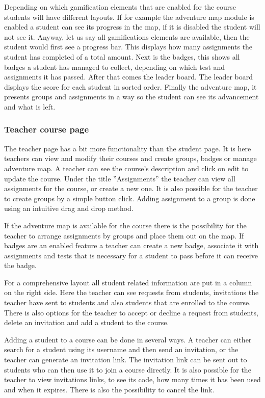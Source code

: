 Depending on which gamification elements that are enabled for the course students will have different layouts. If for example the adventure map module is enabled a student can see its progress in the map, if it is disabled the student will not see it. Anyway, let us say all gamifications elements are available, then the student would first see a progress bar. This displays how many assignments the student has completed of a total amount. Next is the badges, this shows all badges a student has managed to collect, depending on which test and assignments it has passed. After that comes the leader board. The leader board displays the score for each student in sorted order. Finally the adventure map, it presents groups and assignments in a way so the student can see its advancement and what is left. 

\subsubsection{Teacher course page}
The teacher page has a bit more functionality than the student page. It is here teachers can view and modify their courses and create groups, badges or manage adventure map. A teacher can see the course's description and click on edit to update the course. Under the title ''Assignments'' the teacher can view all assignments for the course, or create a new one. It is also possible for the teacher to create groups by a simple button click. Adding assignment to a group is done using an intuitive drag and drop method. 

If the adventure map is available for the course there is the possibility for the teacher to arrange assignments by groups and place them out on the map. If badges are an enabled feature a teacher can create a new badge, associate it with assignments and tests that is necessary for a student to pass before it can receive the badge.

For a comprehensive layout all student related information are put in a column on the right side. Here the teacher can see requests from students, invitations the teacher have sent to students and also students that are enrolled to the course. There is also options for the teacher to accept or decline a request from students, delete an invitation and add a student to the course. 

Adding a student to a course can be done in several ways. A teacher can either search for a student using its username and then send an invitation, or the teacher can generate an invitation link. The invitation link can be sent out to students who can then use it to join a course directly. It is also possible for the teacher to view invitations links, to see its code, how many times it has been used and when it expires. There is also the possibility to cancel the link.

